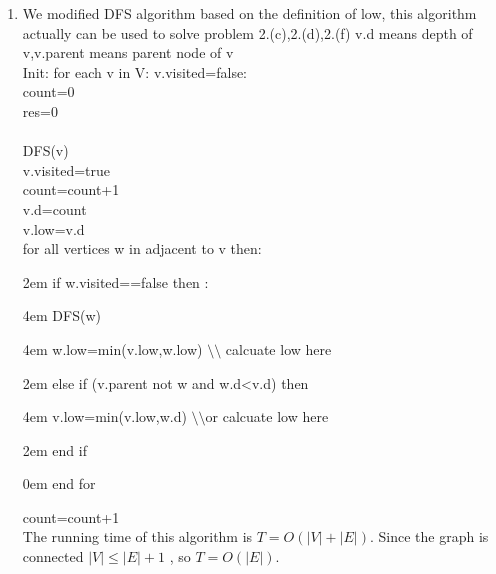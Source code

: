 \documentclass[paper=a4, fontsize=11pt]{scrartcl} %
\numberwithin{equation}{section} %
\numberwithin{figure}{section} %
\numberwithin{table}{section} %
\begin{document}
\begin{enumerate}[label={2.(\alph*)}]
  \item

We modified DFS algorithm based on the definition of low, this algorithm actually can be used to solve problem 2.(c),2.(d),2.(f)
v.d means depth of v,v.parent means parent node of v\\
Init: for each v in V: v.visited=false:\\
count=0\\
res=0\\
\\
DFS(v)\\
	v.visited=true\\
	count=count+1\\
	v.d=count\\
	v.low=v.d\\
	for all vertices w in adjacent to v then: \par
		\setlength{\parindent} {2em} if w.visited==false then :\par
			\setlength{\parindent} {4em} DFS(w)\par
			\setlength{\parindent} {4em} w.low=min(v.low,w.low) $\setminus\setminus$ calcuate low here \par
		\setlength{\parindent} {2em} else if (v.parent not w and w.d<v.d) then \par
			\setlength{\parindent} {4em} v.low=min(v.low,w.d)  $\setminus\setminus$or calcuate low here  \par
		\setlength{\parindent} {2em} end if  \par
\setlength{\parindent} {0em} end for \par
count=count+1\\
The running time of this algorithm is $T = O(|V | + |E|)$. Since the graph is connected ${ |V | \leq |E| + 1 }$ , so $T = O(|E|)$.


\end{enumerate}
\end{document}
